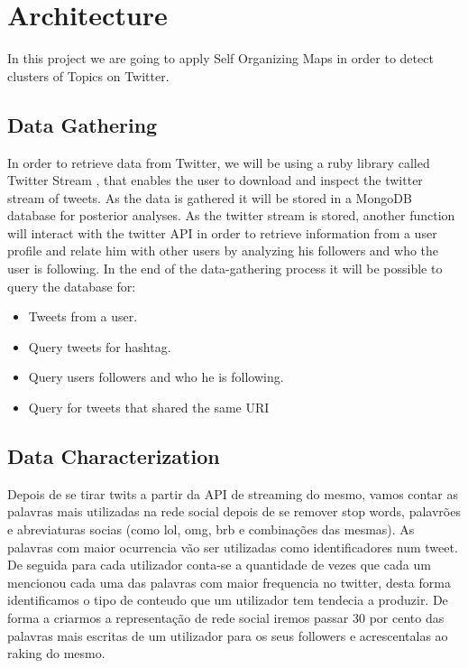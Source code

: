 \section{Architecture}

In this project we are going to apply Self Organizing Maps in order to detect clusters of Topics on Twitter. 

\subsection{Data Gathering} %
 \label{sub:data_gathering}

 In order to retrieve data from Twitter, we will be using a ruby library called Twitter Stream \cite{TweetStream}, that enables the user to download and inspect the twitter stream of tweets. As the data is gathered it will be stored in a MongoDB database for posterior analyses. 
 As the twitter stream is stored, another function will interact with the twitter API in order to retrieve information from a user profile and relate him with other users by analyzing his followers and who the user is following.
 In the end of the data-gathering process it will be possible to query the database for:
 \begin{itemize}
   \item  Tweets from a user.
   \item  Query tweets for hashtag.
   \item  Query users followers and who he is following.
   \item  Query for tweets that shared the same URI 
 \end{itemize}


\subsection{Data Characterization} %
\label{sub:data_labeling}
Depois de se tirar twits a partir da API de streaming do mesmo, vamos contar as palavras mais utilizadas na rede social depois de se remover stop words, palavrões e abreviaturas socias (como lol, omg, brb e combinações das mesmas). As palavras com maior ocurrencia vão ser utilizadas como identificadores num tweet. De seguida para cada utilizador conta-se a quantidade de vezes que cada um mencionou cada uma das palavras com maior frequencia no twitter, desta forma identificamos o tipo de conteudo que um utilizador tem tendecia a produzir. 
De forma a criarmos a representação de rede social iremos passar 30 por cento das palavras mais escritas de um utilizador para os seus followers e acrescentalas ao raking do mesmo.

